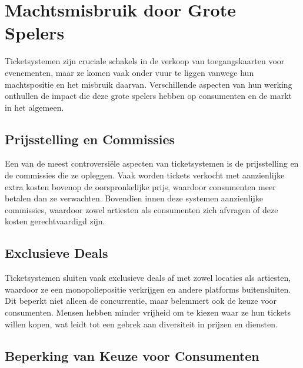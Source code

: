 

\section{Machtsmisbruik door Grote Spelers}
\label{sec:Hoofdstuk_7}

Ticketsystemen zijn cruciale schakels in de verkoop van toegangskaarten voor evenementen, 
maar ze komen vaak onder vuur te liggen vanwege hun machtspositie en het misbruik daarvan. 
Verschillende aspecten van hun werking onthullen de impact die deze grote spelers hebben op consumenten en de markt in het algemeen.

\subsection{Prijsstelling en Commissies}

Een van de meest controversiële aspecten van ticketsystemen is de prijsstelling en de commissies die ze opleggen. 
Vaak worden tickets verkocht met aanzienlijke extra kosten bovenop de oorspronkelijke prijs, 
waardoor consumenten meer betalen dan ze verwachten. Bovendien innen deze systemen aanzienlijke commissies, 
waardoor zowel artiesten als consumenten zich afvragen of deze kosten gerechtvaardigd zijn.

\subsection{Exclusieve Deals}

Ticketsystemen sluiten vaak exclusieve deals af met zowel locaties als artiesten, 
waardoor ze een monopoliepositie verkrijgen en andere platforms buitensluiten. 
Dit beperkt niet alleen de concurrentie, 
maar belemmert ook de keuze voor consumenten. 
Mensen hebben minder vrijheid om te kiezen waar ze hun tickets willen kopen, 
wat leidt tot een gebrek aan diversiteit in prijzen en diensten.

\subsection{Beperking van Keuze voor Consumenten}

